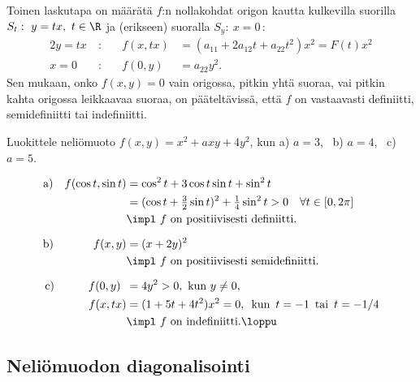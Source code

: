 Toinen laskutapa on määrätä $f$:n nollakohdat origon kautta kulkevilla suorilla
$S_t:\ y=tx,\ t\in\R$ ja (erikseen) suoralla $S_y:\ x=0\,$:
\begin{alignat*}{2}
y = tx\ &:\quad &f(x,tx)&=(a_{11}+2a_{12}t+a_{22}t^2)x^2=F(t)x^2 \\
x = 0 \ &:\quad &f(0,y) &= a_{22}y^2.
\end{alignat*}
Sen mukaan, onko $f(x,y)=0$ vain origossa, pitkin yhtä suoraa, vai pitkin kahta origossa
leikkaavaa suoraa, on pääteltävissä, että $f$ on vastaavasti definiitti, semidefiniitti tai
indefiniitti.
\begin{Exa} Luokittele neliömuoto $f(x,y)=x^2+axy+4y^2$, kun \newline
a) $a=3$, \ b) $a=4$, \ c) $a=5$.
\end{Exa}
\ratk
\begin{align*}
\text{a)}\quad f(\cos t,\sin t) 
         &= \cos^2 t + 3\cos t\sin t + \sin^2 t \\
         &= (\cos t+\tfrac{3}{2}\sin t)^2 + \tfrac{1}{4}\sin^2 t >0\quad\forall t\in [0,2\pi] \\
         &\impl \ f \text{ on positiivisesti definiitti}. \\[2mm]
\text{b)}\quad\qquad\,\  f(x,y) 
         &=(x+2y)^2 \\
         &\impl \ f \text{ on positiivisesti semidefiniitti}. \\[2mm]
\text{c)}\quad\qquad  f(0,y)\,\ 
         &= 4y^2>0,\text{ kun } y\neq 0, \\
 f(x,tx) &=(1+5t+4t^2)x^2=0,\,\ \text{kun}\,\ t=-1\,\ \text{tai}\,\ t=-1/4 \\
         &\impl \ f \text{ on indefiniitti}. \loppu
\end{align*}

\subsection{Neliömuodon diagonalisointi}

